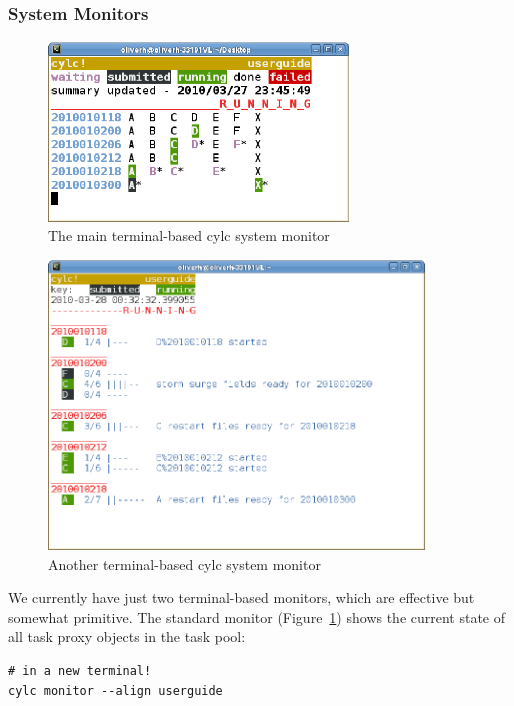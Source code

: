 \documentclass[11pt,a4paper]{article}
\begin{document}
\subsubsection{System Monitors}
\label{QuickSystemMonitors}

\begin{figure} \label{fig-monitor} 
    \begin{center}
        \includegraphics[width=8cm]{monitor-1} 
    \end{center}
    \caption{\small The main terminal-based cylc system monitor}
\end{figure} 

\begin{figure} \label{fig-monitor-r} 
    \begin{center}
        \includegraphics[width=10cm]{monitor-2} 
    \end{center}
    \caption{\small Another terminal-based cylc system monitor}
\end{figure} 


 We currently have just two
terminal-based monitors, which are effective but somewhat primitive.
The standard monitor (Figure~\ref{fig-monitor}) shows the current state
of all task proxy objects in the task pool:

\begin{lstlisting}
# in a new terminal!
cylc monitor --align userguide
\end{lstlisting}
\end{document}
